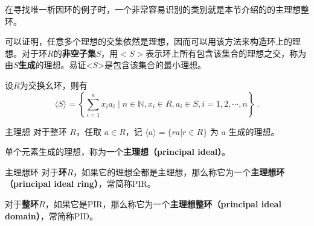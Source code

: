 

在寻找唯一析因环的例子时，一个非常容易识别的类别就是本节介绍的的主理想整环。

可以证明，任意多个理想的交集依然是理想，因而可以用该方法来构造环上的理想。对于环$R$的\textbf{非空子集}$S$，用$<S>$表示环上所有包含该集合的理想之交，称为由$S$\textbf{生成}的理想。易证<$S$>是包含该集合的最小理想。
\begin{example}{}
设$R$为交换幺环，则有
\begin{equation}
\langle S\rangle=\left\{\sum_{i=1}^n x_i a_i \mid n \in \mathbb{N}, x_i \in R, a_i \in S, i=1,2, \cdots, n\right\}~.
\end{equation}
\end{example}
\begin{definition}{主理想}
对于整环 $R$，任取 $a\in R$，记 $\langle a \rangle=\{ra|r\in R\}$ 为 $a$ 生成的理想。

单个元素生成的理想，称为一个\textbf{主理想（principal ideal）}。
\end{definition}

\begin{definition}{主理想环}
对于\textbf{环}$R$，如果它的理想全都是主理想，那么称它为一个\textbf{主理想环（principal ideal ring）}，常简称PIR。

对于\textbf{整环}$R$，如果它是PIR，那么称它为一个\textbf{主理想整环（principal ideal domain）}，常简称PID。
\end{definition}







